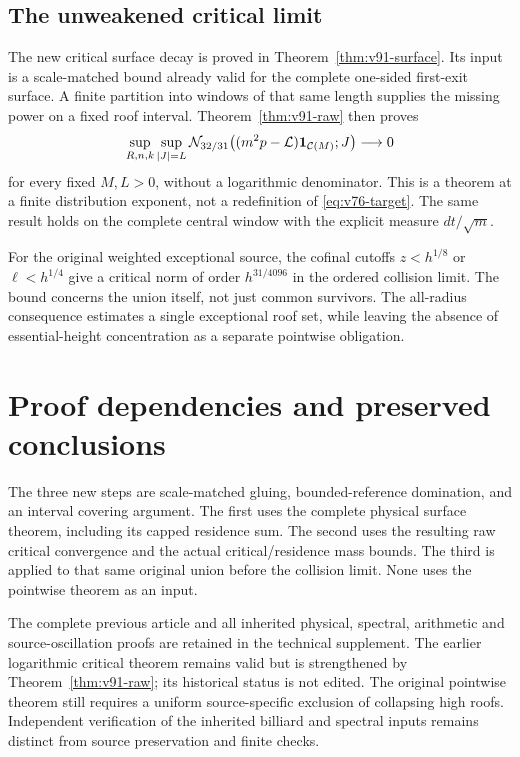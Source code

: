 \documentclass[11pt,reqno]{amsart}
\numberwithin{equation}{section}
\theoremstyle{definition}\newtheorem{definition}[theorem]{Definition}
\theoremstyle{remark}\newtheorem{remark}[theorem]{Remark}
\theoremstyle{definition}\newtheorem{inputstatement}[theorem]{Input statement}
\begin{document}
\subsection{The unweakened critical limit}
The new critical surface decay is proved in
Theorem~\ref{thm:v91-surface}. Its input is a scale-matched bound
already valid for the complete one-sided first-exit surface. A finite
partition into windows of that same length supplies the missing power
on a fixed roof interval. Theorem~\ref{thm:v91-raw} then proves
\[
 \sup_{R,n,k}\sup_{|J|=L}
 \mathcal N_{32/31}\bigl((m^2p-\mathcal L)\mathbf1_{\mathcal C(M)};J\bigr)
                                      \longrightarrow0
\]
for every fixed $M,L>0$, without a logarithmic denominator. This is
a theorem at a finite distribution exponent, not a redefinition of
\eqref{eq:v76-target}. The same result holds on the complete central
window with the explicit measure $dt/\sqrt m$.

For the original weighted exceptional source, the cofinal cutoffs
$z<h^{1/8}$ or $\ell<h^{1/4}$ give a critical norm of order
$h^{31/4096}$ in the ordered collision limit. The bound concerns the
union itself, not just common survivors. The all-radius consequence
estimates a single exceptional roof set, while leaving the absence
of essential-height concentration as a separate pointwise obligation.






\section{Proof dependencies and preserved conclusions}
The three new steps are scale-matched gluing, bounded-reference
domination, and an interval covering argument. The first uses the
complete physical surface theorem, including its capped residence
sum. The second uses the resulting raw critical convergence and the
actual critical/residence mass bounds. The third is applied to that
same original union before the collision limit. None uses the
pointwise theorem as an input.

The complete previous article and all inherited physical, spectral,
arithmetic and source-oscillation proofs are retained in the technical
supplement. The earlier logarithmic critical theorem remains valid
but is strengthened by Theorem~\ref{thm:v91-raw}; its historical
status is not edited. The original pointwise theorem still requires
a uniform source-specific exclusion of collapsing high roofs.
Independent verification of the inherited billiard and spectral
inputs remains distinct from source preservation and finite checks.
\end{document}
